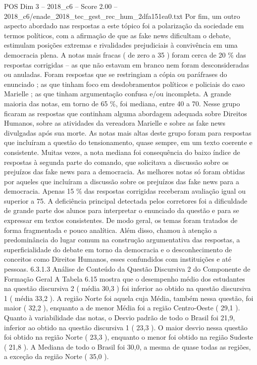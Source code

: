 \begin{textsample}{POS Dim 3 – 2018\_c6 – Score 2.00 – 2018\_c6/enade\_2018\_tec\_gest\_rec\_hum\_2dfa151ea0.txt}
Por fim, um outro aspecto abordado nas respostas a este tópico foi a polarização da sociedade em termos políticos, com a afirmação de que as fake news dificultam o debate, estimulam posições extremas e rivalidades prejudiciais à convivência em uma democracia plena.
A notas mais fracas ( de zero a 35 ) foram cerca de 20 \% das respostas corrigidas – as que não estavam em branco nem foram desconsideradas ou anuladas.
Foram respostas que se restringiam a cópia ou paráfrases do enunciado ; as que tinham foco em desdobramentos políticos e policiais do caso Marielle ; as que tinham argumentação confusa e/ou incompleta.
A grande maioria das notas, em torno de 65 \%, foi mediana, entre 40 a 70.
Nesse grupo ficaram as respostas que continham alguma abordagem adequada sobre Direitos Humanos, sobre as atividades da vereadora Marielle e sobre as fake news divulgadas após sua morte.
As notas mais altas deste grupo foram para respostas que incluíram a questão do tensionamento, quase sempre, em um texto coerente e consistente.
Muitas vezes, a nota mediana foi consequência do baixo índice de respostas à segunda parte do comando, que solicitava a discussão sobre os prejuízos das fake news para a democracia.
As melhores notas só foram obtidas por aqueles que incluíram a discussão sobre os prejuízos das fake news para a democracia.
Apenas 15 \% das respostas corrigidas receberam avaliação igual ou superior a 75.
A deficiência principal detectada pelos corretores foi a dificuldade de grande parte dos alunos para interpretar o enunciado da questão e para se expressar em textos consistentes.
De modo geral, os temas foram tratados de forma fragmentada e pouco analítica.
Além disso, chamou à atenção a predominância do lugar comum na construção argumentativa das respostas, a superficialidade do debate em torno da democracia e o desconhecimento de conceitos como Direitos Humanos, esses confundidos com instituições e até pessoas. 6.3.1.3 Análise de Conteúdo da Questão Discursiva 2 do Componente de Formação Geral A Tabela 6.15 mostra que o desempenho médio dos estudantes na questão discursiva 2 ( média 30,3 ) foi inferior ao obtido na questão discursiva 1 ( média 33,2 ).
A região Norte foi aquela cuja Média, também nessa questão, foi maior ( 32,2 ), enquanto a de menor Média foi a região Centro-Oeste ( 29,1 ).
Quanto à variabilidade das notas, o Desvio padrão de todo o Brasil foi 21,9, inferior ao obtido na questão discursiva 1 ( 23,3 ).
O maior desvio nessa questão foi obtido na região Norte ( 23,3 ), enquanto o menor foi obtido na região Sudeste ( 21,8 ).
A Mediana de todo o Brasil foi 30,0, a mesma de quase todas as regiões, a exceção da região Norte ( 35,0 ).

\end{textsample}

